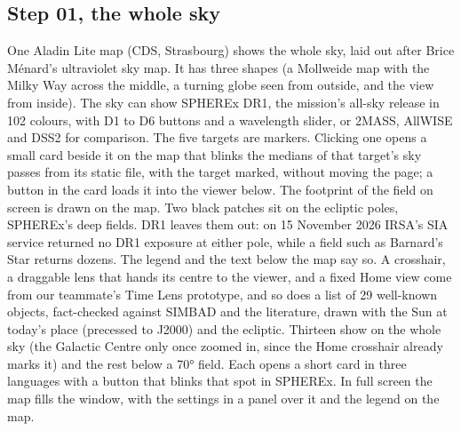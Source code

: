 \documentclass[11pt,a4paper]{article}
\begin{document}
\subsection{Step 01, the whole sky}
One Aladin Lite map (CDS, Strasbourg) shows the whole sky, laid out after Brice M\'enard's
ultraviolet sky map. It has three shapes (a Mollweide map with the Milky Way across the middle,
a turning globe seen from outside, and the view from inside). The sky can show SPHEREx DR1, the mission's all-sky release in 102 colours, with D1 to D6 buttons and a
wavelength slider, or 2MASS, AllWISE and DSS2 for comparison. The five targets are markers.
Clicking one opens a small card beside it on the map that blinks the medians of that target's sky
passes from its static file, with the target marked, without moving the page; a button in the card
loads it into the viewer below. The footprint of the field on screen is drawn on the map.
Two black patches sit on the ecliptic poles, SPHEREx's deep fields. DR1 leaves them out: on
15 November 2026 IRSA's SIA service returned no DR1 exposure at either pole, while a field such as
Barnard's Star returns dozens. The legend and the text below the map say so. A
crosshair, a draggable lens that hands its centre to the viewer, and a fixed Home view come from
our teammate's Time Lens prototype, and so does a list of 29 well-known objects, fact-checked
against SIMBAD and the literature, drawn with the Sun at today's place (precessed to J2000) and
the ecliptic. Thirteen show on the whole sky (the Galactic Centre only once zoomed in, since the Home crosshair already marks it) and the rest below a \ang{70} field. Each opens a
short card in three languages with a button that blinks that spot in SPHEREx. In full screen the
map fills the window, with the settings in a panel over it and the legend on the map.
\end{document}
